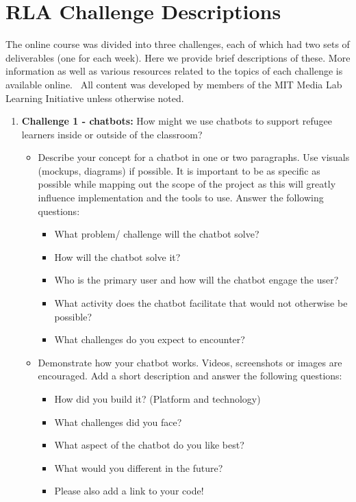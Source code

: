 \documentclass[12pt,twoside,vi]{mitthesis}
\begin{document}
\chapter{RLA Challenge Descriptions}

The online course was divided into three challenges, each of which had two sets of deliverables (one for each week). Here we provide brief descriptions of these. More information as well as various resources related to the topics of each challenge is available online.~\cite{rla} All content was developed by members of the MIT Media Lab Learning Initiative unless otherwise noted.

\begin{enumerate}
\item \textbf{Challenge 1 - chatbots:} How might we use chatbots to support refugee learners inside or outside of the classroom? 
\begin{itemize}
\item Describe your concept for a chatbot in one or two paragraphs. Use visuals (mockups, diagrams) if possible. It is important to be as specific as possible while mapping out the scope of the project as this will greatly influence implementation and the tools to use. Answer the following questions:
\begin{itemize}
\item What problem/ challenge will the chatbot solve? 
\item How will the chatbot solve it? 
\item Who is the primary user and how will the chatbot engage the user?
\item What activity does the chatbot facilitate that would not otherwise be possible? 
\item What challenges do you expect to encounter?
\end{itemize}
\item Demonstrate how your chatbot works. Videos, screenshots or images are encouraged. Add a short description and answer the following questions: 
\begin{itemize}
\item How did you build it? (Platform and technology)
\item What challenges did you face?
\item What aspect of the chatbot do you like best? 
\item What would you different in the future? 
\item Please also add a link to your code!
\end{itemize}

\end{itemize}
\end{enumerate}
\end{document}
